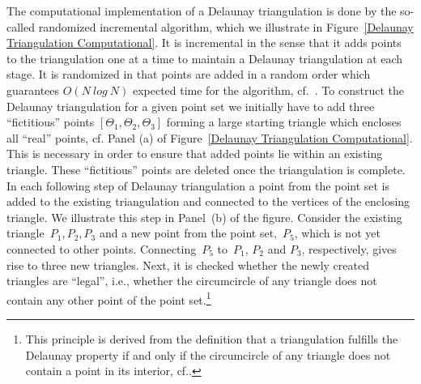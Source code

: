 \documentclass[a4paper,12pt]{article}%
\begin{document}
\begin{figure}[htb]
\begin{tabular}
\end{tabular}
\label{Delaunay Triangulation}
\end{figure}

The computational implementation of a Delaunay triangulation is done by the so-called randomized incremental algorithm, which we illustrate in Figure~\ref{Delaunay Triangulation Computational}. It is incremental in the sense that it adds points to the triangulation one at a time to maintain a Delaunay triangulation at each stage. It is randomized in that points are added in a random order which guarantees $O(N~log~N)$ expected time for the algorithm, cf.~. To construct the Delaunay triangulation for a given point set we initially have to add three ``fictitious'' points $\left[  \Theta_{1},\Theta_{2},\Theta_{3}\right]  $ forming a large starting triangle which encloses all ``real'' points, cf. Panel (a) of Figure~\ref{Delaunay Triangulation Computational}. This is necessary in order to ensure that added points lie within an existing triangle. These ``fictitious'' points are deleted once the triangulation is complete. In each following step of Delaunay triangulation a point from the point set is added to the existing triangulation and connected to the vertices of the enclosing triangle. We illustrate this step in Panel~(b) of the figure. Consider the existing triangle~$P_{1},P_{2},P_{3}$ and a new point from the point set,~$P_{5}$, which is not yet connected to other points. Connecting~$P_{5}$ to~$P_{1}$, $P_{2}$ and $P_{3}$, respectively, gives rise to three new triangles. Next, it is checked whether the newly created triangles are ``legal'', i.e., whether the circumcircle of any triangle does not contain any other point of the point set.\footnote{This principle is derived from the definition that a triangulation fulfills the Delaunay property if and only if the circumcircle of any triangle does not contain a point in its interior, cf..}
\end{document}

